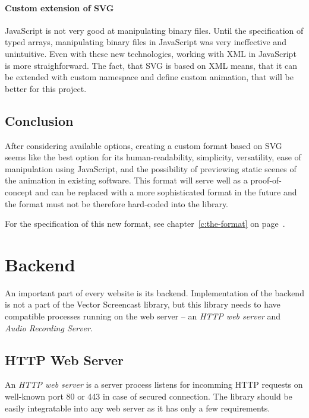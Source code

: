 \paragraph{Custom extension of SVG} JavaScript is not very good at manipulating binary files. Until the specification of typed arrays, manipulating binary files in JavaScript was very ineffective and unintuitive. Even with these new technologies, working with XML in JavaScript is more straighforward. The fact, that SVG is based on XML means, that it can be extended with custom namespace and define custom animation, that will be better for this project.

\subsection{Conclusion}
After considering available options, creating a custom format based on SVG seems like the best option for its human-readability, simplicity, versatility, ease of manipulation using JavaScript, and the possibility of previewing static scenes of the animation in existing software. This format will serve well as a proof-of-concept and can be replaced with a more sophisticated format in the future and the format must not be therefore hard-coded into the library.

For the specification of this new format, see chapter~\ref{c:the-format} on page~\pageref{c:the-format}.









\section{Backend}
An important part of every website is its backend. Implementation of the backend is not a part of the Vector Screencast library, but this library needs to have compatible processes running on the web server -- an \textit{HTTP web server} and \textit{Audio Recording Server}.

\subsection{HTTP Web Server}
An \textit{HTTP web server} is a server process listens for incomming HTTP requests on well-known port 80 or 443 in case of secured connection. The library should be easily integratable into any web server as it has only a few requirements.

